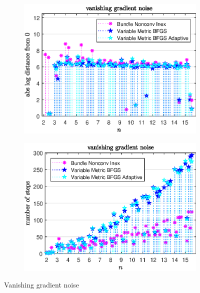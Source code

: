 \begin{figure}[ht]
	\begin{subfigure}{0.49\textwidth}
		\includegraphics[width=\textwidth]{Pictures/Plots/vanishing_gradient_noise2.eps}%
	\end{subfigure}
	\begin{subfigure}{0.49\textwidth}
		\includegraphics[width=\textwidth]{Pictures/Plots/steps_vanishing_gradient_noise2.eps}%
	\end{subfigure}
	\caption{Vanishing gradient noise}%
	\label{fig_van_grad_noise}%
\end{figure}




